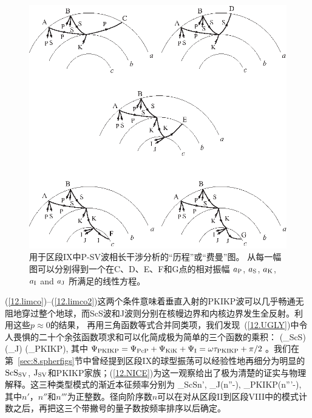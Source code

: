 \begin{figure}[!t]
\begin{center}
\includegraphics{../figures/chap12/fig14.eps}
\end{center}
\caption[FeynmanRegimeIX]{\label{12.fig.zhao11}
用于区段IX中P-SV波相长干涉分析的“历程”或“费曼”图。
从每一幅图可以分别得到一个在C、D、E、F和G点的相对振幅 
$a_{\rm P}$, $a_{\rm S}$,
$a_{\rm K}$, $a_{\rm I}$ and $a_{\rm J}$ 所满足的线性方程。}
\end{figure}
(\ref{12.limco})--(\ref{12.limco2})这两个条件意味着垂直入射的PKIKP波可以几乎畅通无阻地穿过整个地球，而ScS波和J波则分别在核幔边界和内核边界发生全反射。利用这些$p\approx 0$的结果，
再用三角函数等式合并同类项，我们发现~(\ref{12.UGLY})中令人畏惧的二十个余弦函数项求和可以化简成极为简单的三个函数的乘积：
\eq \label{12.NICE}
(\sin\half\Psi_{\rm ScS})(\cos\half\Psi_{\rm J})
(\sin\half\Psi_{\rm PKIKP}),
\en
其中$\Psi_{\rm PKIKP}=\Psi_{\rm PcP}+\Psi_{\rm KiK}+\Psi_{\rm I}
=\omega\tau_{\rm PKIKP}+\pi/2$。我们在第~\ref{sec:8.spherfigs}节中曾经提到区段IX的球型振荡可以经验性地再细分为明显的${\rm ScS}_{\rm SV}$, ${\rm J}_{\rm SV}$和PKIKP家族；(\ref{12.NICE})为这一观察给出了极为清楚的证实与物理解释。这三种类型模式的渐近本征频率分别为
%
%
%
%
%
%
\eq \label{12.ScS}
\omega\tau_{\rm ScS}\pi n',
\en
\eq \label{12.Jfreq}
\omega\tau_{\rm J}\pi(n''-\fourth),
\en
\eq \label{12.PKIKP}
\omega\tau_{\rm PKIKP}\pi(n'''-\fourth),
\en
其中$n'$，$n''$和$n'''$为正整数。径向阶序数$n$可以在对从区段II到区段VIII中的模式计数之后，再把这三个带撇号的量子数按频率排序以后确定。

